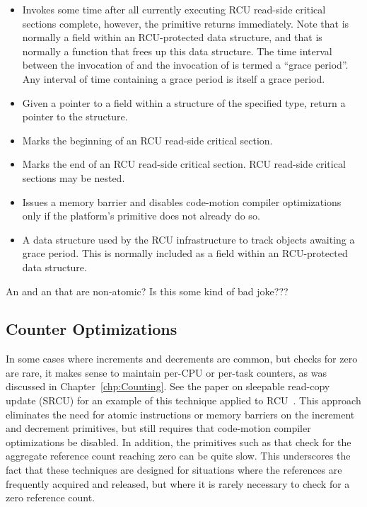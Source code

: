 \begin{itemize}
\item	{}
	Invokes  some time after all currently executing RCU
	read-side critical sections complete, however, the 
	primitive returns immediately.
	Note that  is normally a field within an RCU-protected
	data structure, and that  is normally a function that
	frees up this data structure.
	The time interval between the invocation of  and
	the invocation of  is termed a ``grace period''.
	Any interval of time containing a grace period is itself a
	grace period.
\item	{}
	Given a pointer  to a field  within a structure
	of the specified type, return a pointer to the structure.
\item	{}
	Marks the beginning of an RCU read-side critical section.
\item	{}
	Marks the end of an RCU read-side critical section.
	RCU read-side critical sections may be nested.
\item	{}
	Issues a memory barrier and disables code-motion compiler
	optimizations only if the platform's 
	primitive does not already do so.
\item	{}
	A data structure used by the RCU infrastructure to track
	objects awaiting a grace period.
	This is normally included as a field within an RCU-protected
	data structure.
\fi
\end{itemize}

\QuickQuiz{}
	An  and an  that are
	non-atomic?
	Is this some kind of bad joke???
 \QuickQuizEnd

\subsection{Counter Optimizations}
\label{sec:together:Counter Optimizations}

In some cases where increments and decrements are common, but checks
for zero are rare, it makes sense to maintain per-CPU or per-task
counters, as was discussed in Chapter~\ref{chp:Counting}.
See the paper on sleepable read-copy update
(SRCU) for an example of this technique applied to
RCU~\cite{PaulEMcKenney2006c}.
This approach eliminates the need for atomic instructions or memory
barriers on the increment and decrement primitives, but still requires
that code-motion compiler optimizations be disabled.
In addition, the primitives such as 
that check for the aggregate reference
count reaching zero can be quite slow.
This underscores the fact that these techniques are designed
for situations where the references are frequently acquired and
released, but where it is rarely necessary to check for a zero
reference count.

